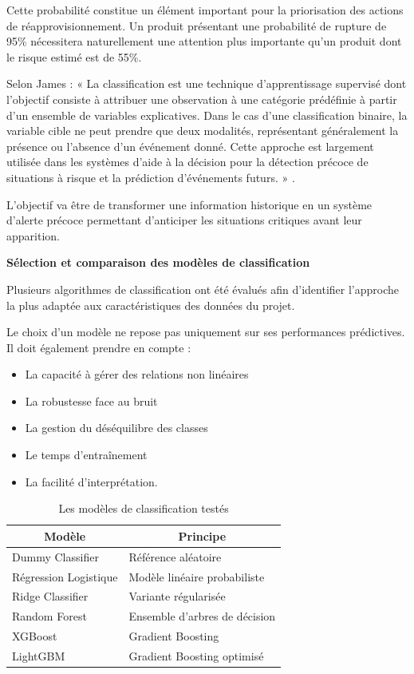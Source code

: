 Cette probabilité constitue un élément important pour la priorisation des actions de réapprovisionnement. Un produit présentant une probabilité de rupture de 95\% nécessitera naturellement une attention plus importante qu'un produit dont le risque estimé est de 55\%.
 
Selon James \cite{james2021} : « La classification est une technique d'apprentissage supervisé dont l'objectif consiste à attribuer une observation à une catégorie prédéfinie à partir d'un ensemble de variables explicatives. Dans le cas d'une classification binaire, la variable cible ne peut prendre que deux modalités, représentant généralement la présence ou l'absence d'un événement donné. Cette approche est largement utilisée dans les systèmes d'aide à la décision pour la détection précoce de situations à risque et la prédiction d'événements futurs. » .
 
L'objectif va être de transformer une information historique en un système d'alerte précoce permettant d'anticiper les situations critiques avant leur apparition.
 
\textbf{Sélection et comparaison des modèles de classification}
 
Plusieurs algorithmes de classification ont été évalués afin d'identifier l'approche la plus adaptée aux caractéristiques des données du projet.
 
Le choix d'un modèle ne repose pas uniquement sur ses performances prédictives. Il doit également prendre en compte :
 
\begin{itemize}
    \item La capacité à gérer des relations non linéaires 
    \item La robustesse face au bruit 
    \item La gestion du déséquilibre des classes 
    \item Le temps d'entraînement 
    \item La facilité d'interprétation.
\end{itemize}
 
\begin{table}[H]
\centering
\caption{Les modèles de classification testés}
\label{tab:ch4:modeles_classification}
\small
\begin{tabular}{|p{4cm}|p{10cm}|}
\hline
\multicolumn{1}{|c|}{\textbf{Modèle}} & \multicolumn{1}{c|}{\textbf{Principe}} \\
\hline
Dummy Classifier & Référence aléatoire \\
\hline
Régression Logistique & Modèle linéaire probabiliste \\
\hline
Ridge Classifier & Variante régularisée \\
\hline
Random Forest & Ensemble d'arbres de décision \\
\hline
XGBoost & Gradient Boosting \\
\hline
LightGBM & Gradient Boosting optimisé \\
\hline
\end{tabular}
\end{table}
 
